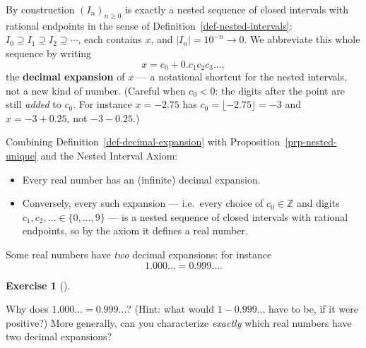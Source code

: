 \documentclass[
  letterpaper,
  DIV=11,
  numbers=noendperiod]{scrreprt}
\providecommand{\tightlist}{%
  \setlength{\itemsep}{0pt}\setlength{\parskip}{0pt}}
\theoremstyle{plain}
\theoremstyle{plain}
\theoremstyle{definition}
\theoremstyle{definition}
\newtheorem{exercise}{Exercise}[chapter]
\theoremstyle{definition}
\theoremstyle{plain}
\theoremstyle{plain}
\theoremstyle{remark}
\begin{document}
By construction \((I_n)_{n\ge0}\) is exactly a nested sequence of closed
intervals with rational endpoints in the sense of
Definition~\ref{def-nested-intervals}:
\(I_0\supseteq I_1\supseteq I_2\supseteq\cdots\), each contains \(x\),
and \(|I_n| = 10^{-n} \to 0\). We abbreviate this whole sequence by
writing \[
x = c_0 + 0.c_1c_2c_3\ldots,
\] the \textbf{decimal expansion} of \(x\) --- a notational shortcut for
the nested intervals, not a new kind of number. (Careful when \(c_0<0\):
the digits after the point are still \emph{added} to \(c_0\). For
instance \(x=-2.75\) has \(c_0 = \lfloor -2.75\rfloor = -3\) and
\(x = -3 + 0.25\), not \(-3-0.25\).)

Combining Definition~\ref{def-decimal-expansion} with
Proposition~\ref{prp-nested-unique} and the Nested Interval Axiom:

\begin{itemize}
\tightlist
\item
  Every real number has an (infinite) decimal expansion.
\item
  Conversely, every such expansion --- i.e.~every choice of
  \(c_0\in\mathbb{Z}\) and digits \(c_1,c_2,\dots\in\{0,\dots,9\}\) ---
  is a nested sequence of closed intervals with rational endpoints, so
  by the axiom it defines a real number.
\end{itemize}

\begin{tcolorbox}[enhanced jigsaw, arc=.35mm, bottomrule=.15mm, bottomtitle=1mm, breakable, colback=white, colbacktitle=quarto-callout-warning-color!10!white, colframe=quarto-callout-warning-color-frame, coltitle=black, left=2mm, leftrule=.75mm, opacityback=0, opacitybacktitle=0.6, rightrule=.15mm, title={Decimal expansions are not always unique}, titlerule=0mm, toprule=.15mm, toptitle=1mm]

Some real numbers have \emph{two} decimal expansions: for instance \[
1.000\ldots = 0.999\ldots.
\]

\end{tcolorbox}

\begin{exercise}[]\protect\hypertarget{exr-decimal-not-unique}{}\label{exr-decimal-not-unique}

Why does \(1.000\ldots = 0.999\ldots\)? (Hint: what would
\(1 - 0.999\ldots\) have to be, if it were positive?) More generally,
can you characterize \emph{exactly} which real numbers have two decimal
expansions?

\end{exercise}
\end{document}
